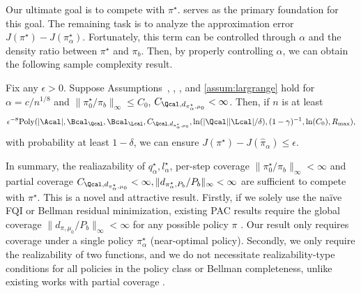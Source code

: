Our ultimate goal is to compete with $\pi^{\star}$. 
 serves as the primary foundation for this goal. The remaining task is to analyze the approximation error $J(\pi^{\star})-J(\pi^{\star}_{\alpha})$. Fortunately, this term can be controlled through  $\alpha$ and the density ratio between $\pi^{\star}$ and $\pi_b$. Then, by properly controlling $\alpha$, we can obtain the following sample complexity result.
 
\begin{theorem}\label{cor:main}
Fix any $\epsilon>0$. Suppose Assumptions~, , , and \ref{assum:largrange} hold for $\alpha=c/n^{1/8}$ and  $\|\pi^{\star}_{0}/\pi_b\|_{\infty}\leq C_{0}$, $C_{\Qcal,d_{\pi^{\star}_{\alpha},\mu_0} }<\infty$. Then, if $n$ is at least  
{
\begin{align*}
\epsilon^{-8}\mathrm{Poly}(|\Acal|,\Bcal_{\Qcal},\Bcal_{\Lcal},C_{\Qcal,d_{\pi^{\star}_{\alpha},\mu_0} }, \ln(|\Qcal||\Lcal|/\delta),%
(1-\gamma)^{-1},\ln(C_0),R_{\max}), 
\end{align*}
}
with probability at least $1-\delta$, we can ensure $ J(\pi^{\star})-J(\hat \pi_{\alpha})\leq \epsilon$. 
\end{theorem}


{\finaledit In summary, the realiazability of $q^{\star}_{\alpha},l^{\star}_{\alpha}$, per-step coverage $\|\pi^{\star}_0/\pi_b\|_{\infty}<\infty$ and partial coverage $C_{\Qcal,d_{\pi^{\star}_{\alpha},\mu_0} }<\infty,\|d_{\pi^{\star}_{\alpha},P_b}/P_b\|_{\infty}<\infty $ are sufficient to compete with $\pi^{\star}$.} This is a novel and attractive result. Firstly, if we solely use the na\"ive FQI or Bellman residual minimization, existing PAC results require the global coverage $\|d_{\pi,\mu_0}/P_b\|_{\infty}<\infty$ for any possible policy $\pi$ \citep{munos2008finite,antos2008learning}. Our result only requires coverage under a single policy $\pi^{\star}_{\alpha}$ (near-optimal policy). Secondly, we only require the realizability of two functions, and we do not necessitate realizability-type conditions for all policies in the policy class or Bellman completeness, unlike existing works with partial coverage \citep{xie2021bellman,jiang2020minimax}. 



